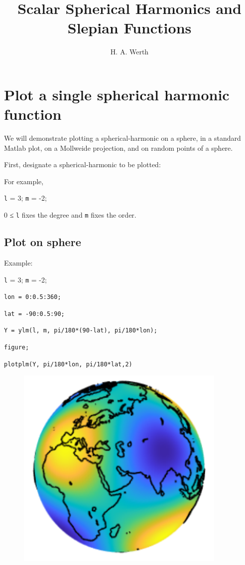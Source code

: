 \documentclass{article}
\title{Scalar Spherical Harmonics and Slepian Functions}
\author{H. A. Werth}
\date{}
\begin{document}
\maketitle

\tableofcontents 

\section{Plot a single spherical harmonic function}

We will demonstrate plotting a spherical-harmonic on a sphere,  in a standard Matlab plot, on a Mollweide projection, and on random points of a sphere.

First, designate a spherical-harmonic to be plotted:

For example,

\verb+l+ = 3; \verb+m+ = -2;

0 ≤ \verb+l+ fixes the degree and \verb+m+ fixes the order.

\subsection{Plot on sphere}

Example:
\vspace{2mm}

\setlength{\parskip}{.1mm}

\verb+l+ = 3; \verb+m+ = -2;

\verb+lon = 0:0.5:360;+

\verb+lat = -90:0.5:90;+

\verb+Y = ylm(l, m, pi/180*(90-lat), pi/180*lon);+

\verb+figure;+

\verb+plotplm(Y, pi/180*lon, pi/180*lat,2)+

\begin{figure}[H]
\includegraphics[scale=1]{graph_on_sphere}
\end{figure}
\end{document}
